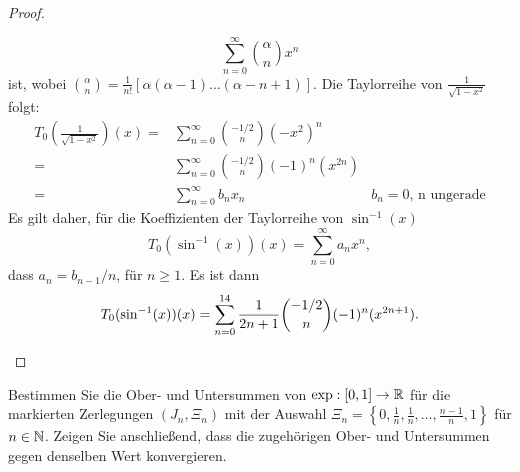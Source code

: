 \begin{proof}
\begin{parts}
{\begin{equation}
			\sum_{n=0}^{\infty} \binom{\alpha}{n}x^n
		\end{equation}
		ist, wobei $\binom{\alpha}{n}=\frac{1}{n!}\left[ \alpha(\alpha-1)\dots(\alpha-n+1) \right] $. Die Taylorreihe von $\frac{1}{\sqrt{1-x^2} }$ folgt:
		\begin{align*}
			T_{0}\left( \frac{1}{\sqrt{1-x^2} } \right)(x)=& \sum_{n=0}^{\infty} \binom{-1 / 2}{n}\left( -x^2 \right)^n\\
			=& \sum_{n=0}^{\infty} \binom{-1 / 2}{n}(-1)^n(x^{2n})\\
			=& \sum_{n=0}^{\infty} b_n x_n & b_n=0\text{, n ungerade}
\end{align*}
		Es gilt daher, f\"{u}r die Koeffizienten der Taylorreihe von $\sin^{-1}(x)$
		 \[
			 T_{0}(\sin^{-1}(x))(x)=\sum_{n=0}^{\infty} a_n x^n
		,\] 
		dass $a_n=b_{n-1} / n$, f\"{u}r $n\ge 1$. Es ist dann
		 \[
			 T_{0}(\sin^{-1}(x))(x)=\sum_{n=0}^{14} \frac{1}{2n+1}\binom{-1 / 2}{n}(-1)^n(x^{2n+1})
		.\qedhere\] 
	}
	\end{parts}
\end{proof}
\begin{Problem}
	Bestimmen Sie die Ober- und Untersummen von $\exp : [0, 1] \to\mathbb{R}$ für die markierten Zerlegungen $(J_n, \Xi_n)$ mit der Auswahl $\Xi_n = \left\{ 0,\frac{1}{n},\frac{1}{n},\dots,\frac{n-1}{n},1 \right\} $ für $n \in \mathbb{N}$. Zeigen Sie anschließend, dass die zugehörigen Ober- und Untersummen gegen denselben Wert konvergieren.
\end{Problem}

